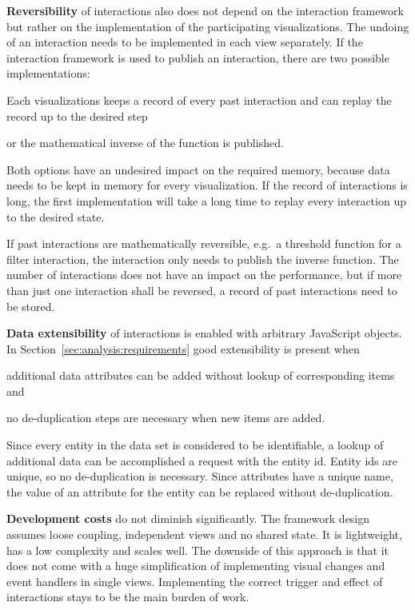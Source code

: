 \textbf{Reversibility} of interactions also does not depend on the interaction framework but rather on the implementation of the participating visualizations.
The undoing of an interaction needs to be implemented in each view separately.
If the interaction framework is used to publish an  interaction, there are two possible implementations:
\begin{enumerate*}[label=(\arabic*)]
  \item
    Each visualizations keeps a record of every past interaction and can replay the record up to the desired step
    \item
    or the mathematical inverse of the function is published.
\end{enumerate*}
Both options have an undesired impact on the required memory, because data needs to be kept in memory for every visualization.
If the record of interactions is long, the first implementation will take a long time to replay every interaction up to the desired state.

If past interactions are mathematically reversible, e.g.\ a threshold function for a filter interaction, the  interaction only needs to publish the inverse function.
The number of interactions does not have an impact on the performance, but if more than just one interaction shall be reversed, a record of past interactions need to be stored.

\textbf{Data extensibility} of interactions is enabled with arbitrary JavaScript objects.
In Section~\ref{sec:analysis:requirements} good extensibility is present when
\begin{enumerate*}[label=(\arabic*)]
  \item
    additional data attributes can be added without lookup of corresponding items and
  \item
    no de-duplication steps are necessary when new items are added.
\end{enumerate*}
Since every entity in the data set is considered to be identifiable, a lookup of additional data can be accomplished a request with the entity id.
Entity ids are unique, so no de-duplication is necessary.
Since attributes have a unique name, the value of an attribute for the entity can be replaced without de-duplication.

\textbf{Development costs} do not diminish significantly.
The framework design assumes loose coupling, independent views and no shared state.
It is lightweight, has a low complexity and scales well.
The downside of this approach is that it does not come with a huge simplification of implementing visual changes and event handlers in single views.
Implementing the correct trigger and effect of interactions stays to be the main burden of work.

